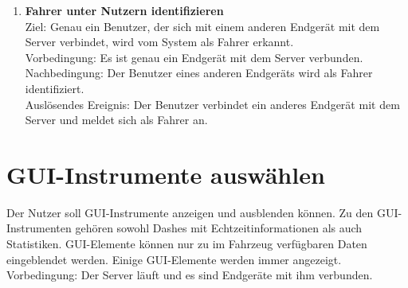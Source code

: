 \documentclass[pflichtenheft.tex]{subfiles}
\begin{document}
\begin{enumerate}
		\item{\textbf{Fahrer unter Nutzern identifizieren}} \label{driver2}
		\\ Ziel: Genau ein Benutzer, der sich mit einem anderen Endgerät mit dem Server verbindet, wird vom System als Fahrer erkannt.  \\
		Vorbedingung: Es ist genau ein Endgerät mit dem Server verbunden.\\
		Nachbedingung: Der Benutzer eines anderen Endgeräts wird als Fahrer identifiziert. \\
		Auslösendes Ereignis: Der Benutzer verbindet ein anderes Endgerät mit dem Server und meldet sich als Fahrer an.

		\setcounter{enumTemp}{\value{enumi}}
		

	\end{enumerate}
	
	\section{GUI-Instrumente auswählen}
	Der Nutzer soll GUI-Instrumente anzeigen und ausblenden können. Zu den GUI-Instrumenten gehören sowohl Dashes mit Echtzeitinformationen als auch Statistiken. GUI-Elemente können nur zu im Fahrzeug verfügbaren Daten eingeblendet werden. Einige GUI-Elemente werden immer angezeigt.\\
	Vorbedingung: Der Server läuft und es sind Endgeräte mit ihm verbunden.
	
\end{document}
